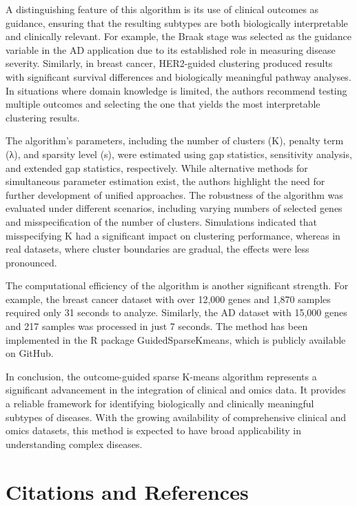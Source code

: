 \documentclass{statsoc}
\begin{document}
A distinguishing feature of this algorithm is its use of clinical outcomes as guidance, ensuring that the resulting subtypes are both biologically interpretable and clinically relevant. For example, the Braak stage was selected as the guidance variable in the AD application due to its established role in measuring disease severity. Similarly, in breast cancer, HER2-guided clustering produced results with significant survival differences and biologically meaningful pathway analyses. In situations where domain knowledge is limited, the authors recommend testing multiple outcomes and selecting the one that yields the most interpretable clustering results. 

The algorithm’s parameters, including the number of clusters (K), penalty term (λ), and sparsity level (s), were estimated using gap statistics, sensitivity analysis, and extended gap statistics, respectively. While alternative methods for simultaneous parameter estimation exist, the authors highlight the need for further development of unified approaches. The robustness of the algorithm was evaluated under different scenarios, including varying numbers of selected genes and misspecification of the number of clusters. Simulations indicated that misspecifying K had a significant impact on clustering performance, whereas in real datasets, where cluster boundaries are gradual, the effects were less pronounced.

The computational efficiency of the algorithm is another significant strength. For example, the breast cancer dataset with over 12,000 genes and 1,870 samples required only 31 seconds to analyze. Similarly, the AD dataset with 15,000 genes and 217 samples was processed in just 7 seconds. The method has been implemented in the R package GuidedSparseKmeans, which is publicly available on GitHub.

In conclusion, the outcome-guided sparse K-means algorithm represents a significant advancement in the integration of clinical and omics data. It provides a reliable framework for identifying biologically and clinically meaningful subtypes of diseases. With the growing availability of comprehensive clinical and omics datasets, this method is expected to have broad applicability in understanding complex diseases.


\section{Citations and References}


\end{document}
